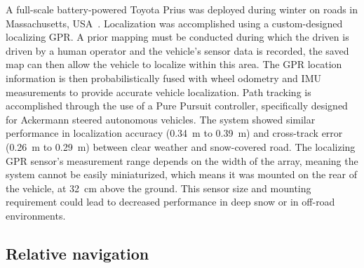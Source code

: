 A full-scale battery-powered Toyota Prius was deployed during winter on roads in Massachusetts, USA~\citep{Ort2020}.
Localization was accomplished using a custom-designed localizing \ac{GPR}. 
A prior mapping must be conducted during which the driven is driven by a human operator and the vehicle's sensor data is recorded, the saved map can then allow the vehicle to localize within this area.
The \ac{GPR} location information is then probabilistically fused with wheel odometry and \ac{IMU} measurements to provide accurate vehicle localization.
Path tracking is accomplished through the use of a Pure Pursuit controller, specifically designed for Ackermann steered autonomous vehicles.
The system showed similar performance in localization accuracy (\SI{0.34}{m} to \SI{0.39}{m}) and cross-track error (\SI{0.26}{m} to \SI{0.29}{m}) between clear weather and snow-covered road.
The localizing \ac{GPR} sensor's measurement range depends on the width of the array, meaning the system cannot be easily miniaturized, which means it was mounted on the rear of the vehicle, at \SI{32}{cm} above the ground.
This sensor size and mounting requirement could lead to decreased performance in deep snow or in off-road environments. 

\subsection{Relative navigation}
\label{rel_nav}



\lightlipsum[1]
\lightlipsum[1]